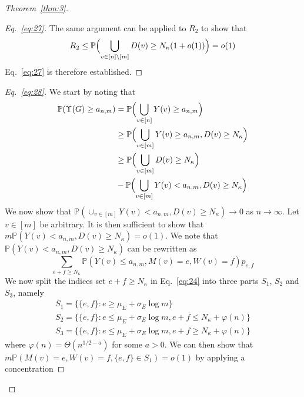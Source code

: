 \documentclass[draftcls]{IEEEtran}
\theoremstyle{definition}
\begin{document}
\begin{proof}[Theorem~\ref{thm:3}]
\begin{proof}[Eq.~\eqref{eq:27}]
The same argument can be applied to $R_2$ to show that
\begin{equation}
  \label{eq:38}
  R_2 \leq \mathbb{P}\Bigl(\bigcup_{v \in [n] \setminus [m]} D(v) \geq
  N_{\kappa}(1 + o(1))\Bigr) = o(1)
\end{equation}
Eq.~\eqref{eq:27} is therefore established.
\end{proof}
\begin{proof}[Eq.~\eqref{eq:28}]
  We start by noting that
  \begin{equation*}
    \begin{split}
      \mathbb{P}(\Upsilon(G) \geq a_{n,m}) &=
      \mathbb{P}\Bigl(\bigcup_{v \in [n]}Y(v) \geq
      a_{n,m}\Bigr) \\
      & \geq \mathbb{P}\Bigl(\bigcup_{v \in [m]}Y(v) \geq
      a_{n,m}, D(v) \geq N_\kappa \Bigr) \\
      & \geq \mathbb{P}\Bigl(\bigcup_{v \in [m]} D(v) \geq
      N_\kappa\Bigr) \\ &- \mathbb{P}\Bigl( \bigcup_{v
        \in [m]} Y(v) < a_{n,m}, D(v) \geq N_\kappa\Bigr)
    \end{split}
  \end{equation*}
  We now show that $\mathbb{P}( \cup_{v
        \in [m]} Y(v) < a_{n,m}, D(v) \geq N_\kappa) \rightarrow 0$ as
      $n \rightarrow \infty$. Let $v \in [m]$ be arbitrary. It is then
      sufficient to show that $m\mathbb{P}(Y(v) < a_{n,m}, D(v) \geq
      N_{\kappa}) = o(1)$. We note that $\mathbb{P}(Y(v) < a_{n,m}, D(v) \geq
      N_{\kappa})$ can be rewritten as
      \begin{equation}
        \label{eq:24}
        \sum_{e + f \geq N_{\kappa}}{\mathbb{P}(Y(v) \leq a_{n,m}, M(v) = e, W(v) =
          f)}p_{e,f}
      \end{equation}
We now split the indices set $e + f \geq N_{\kappa}$ in
Eq.~\eqref{eq:24} into three parts $S_1$, $S_2$ and $S_3$, namely
\begin{gather}
  \label{eq:32}
    S_1 = \{ \{e,f\}\colon e \geq
        \mu_E + \sigma_E \log{m}\} \\
    S_2 = \{ \{e,f\} \colon  e \leq
        \mu_E + \sigma_E \log{m},e + f \leq
        N_\kappa + \varphi(n)\} \\
    S_3 = \{ \{e,f\} \colon e \leq \mu_E + \sigma_E \log{m}, e + f \geq
        N_\kappa + \varphi(n)\}
\end{gather}
where $\varphi(n) = \Theta(n^{1/2 - a})$ for some $a > 0$. We can then
show that $m\mathbb{P}(M(v) = e,
W(v) =f, \{e,f\} \in S_1) = o(1)$ by applying a concentration

\end{proof}
\end{proof}
\end{document}

